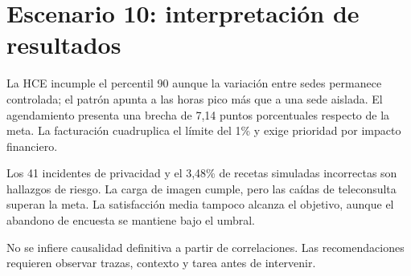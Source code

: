\chapter{Escenario 10: interpretación de resultados}

La HCE incumple el percentil 90 aunque la variación entre sedes permanece controlada; el patrón apunta a las horas pico más que a una sede aislada. El agendamiento presenta una brecha de 7,14 puntos porcentuales respecto de la meta. La facturación cuadruplica el límite del 1\% y exige prioridad por impacto financiero.

Los 41 incidentes de privacidad y el 3,48\% de recetas simuladas incorrectas son hallazgos de riesgo. La carga de imagen cumple, pero las caídas de teleconsulta superan la meta. La satisfacción media tampoco alcanza el objetivo, aunque el abandono de encuesta se mantiene bajo el umbral.

No se infiere causalidad definitiva a partir de correlaciones. Las recomendaciones requieren observar trazas, contexto y tarea antes de intervenir.

